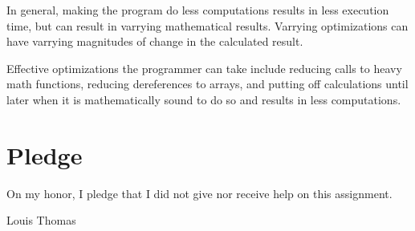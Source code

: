 \documentclass[12pt]{article}
\begin{document}
	In general, making the program do less computations results in less execution time, but can result in varrying mathematical results.
	Varrying optimizations can have varrying magnitudes of change in the calculated result.

	Effective optimizations the programmer can take include reducing calls to heavy math functions, 
		reducing dereferences to arrays, 
		and putting off calculations until later when it is mathematically sound to do so and results in less computations.

	\section{Pledge}
	On my honor, I pledge that I did not give nor receive help on this assignment.

	\vspace{1cm}

	Louis Thomas
\end{document}
